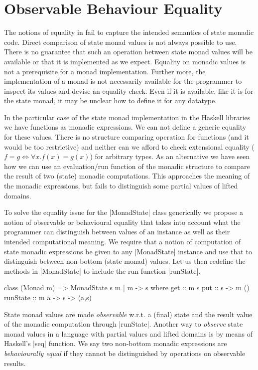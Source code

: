 
\section{Observable Behaviour Equality}
\label{sec:obs-eq}

The notions of equality in  fail to capture the
intended semantics of state monadic code.
%
Direct comparison of state monad values is not always possible to use.
%
There is no guarantee that such an operation between state monad
values will be available or that it is implemented as we expect.
%
Equality on monadic values is not a prerequisite for a monad
implementation.
%
Further more, the implementation of a monad is not necessarily
available for the programmer to inspect its values and devise an
equality check.
%
Even if it is available, like it is for the state monad, it may be
unclear how to define it for any datatype.


In the particular case of the state monad implementation in the
Haskell libraries we have functions as monadic expressions.
%
We can not define a generic equality for these values.
%
There is no structure comparing operation for functions (and it would
be too restrictive) and neither can we afford to check extensional
equality ($f = g  \iff  \forall x. f(x)=g(x)$) for arbitrary types.
%
As an alternative we have seen how we can use an evaluation/run
function of the monadic structure to compare the result of two (state)
monadic computations.
%
This approaches the meaning of the monadic expressions, but fails to
distinguish some partial values of lifted domains.


To solve the equality issue for the |MonadState| class generically we
propose a notion of observable or behavioural equality that takes into
account what the programmer can distinguish between values of an
instance as well as their intended computational meaning.
%
We require that a notion of computation of state monadic expressions
be given to any |MonadState| instance and use that to distinguish
between non-bottom (state monad) values.
%
Let us then redefine the methods in |MonadState| to include the run
function |runState|.
%
\begin{code}
class (Monad m) => MonadState s m | m -> s where
    get       ::  m s
    put       ::  s   ->  m ()
    runState  ::  m a ->  s  -> (a,s)
\end{code}
%
State monad values are made \emph{observable} w.r.t. a (final) state
and the result value of the monadic computation through |runState|.
%
Another way to \emph{observe} state monad values in a language with
partial values and lifted domains is by means of Haskell's |seq|
function.
%
We say two non-bottom monadic expressions are \emph{behaviourally
  equal} if they cannot be distinguished by operations on observable
results.



